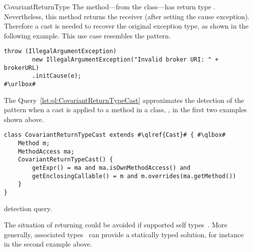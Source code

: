 \begin{pattern}{CovariantReturnType}
The  method---from the  class---has return type .
Nevertheless, this method returns the receiver (after setting the cause exception).
Therefore a cast is needed to recover the original exception type,
as shown in the following example.
This use case resembles the  pattern.

\def\urlvar{http://bit.ly/apache_activemq_2EnSivc}
\begin{verbatim}
throw (IllegalArgumentException)
        new IllegalArgumentException("Invalid broker URI: " + brokerURL)
        .initCause(e);
#\urlbox#
\end{verbatim}


\detection{}
The Query~\ref{lst:ql:CovariantReturnTypeCast} approximates the detection of the \thisp{} pattern when a cast is applied to a method in a  class, \eg{},
in the first two examples shown above.

\begin{listing}
\begin{verbatim}
class CovariantReturnTypeCast extends #\qlref{Cast}# { #\qlbox#
	Method m;
	MethodAccess ma;
	CovariantReturnTypeCast() {
		getExpr() = ma and ma.isOwnMethodAccess() and
		getEnclosingCallable() = m and m.overrides(ma.getMethod())
	}
}
\end{verbatim}
\caption{\thisp{} detection query.}
\label{lst:ql:CovariantReturnTypeCast}
\end{listing}


\issues{}
The situation of returning  could be avoided if \java{} supported self types~\citep{bruceChallengingTypingIssues2003}.
More generally, associated types~\citep{chakravartyAssociatedTypeSynonyms2005} can provide a statically typed solution,
for instance in the second example above.

\end{pattern}
